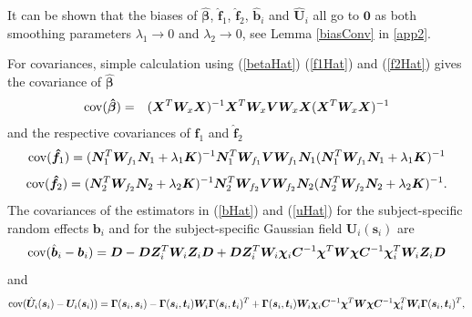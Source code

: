 \documentclass[review]{elsarticle}
\begin{document}
It can be shown that the biases of $\boldsymbol {\hat \beta}$, $\boldsymbol {\hat f}_1$, $\boldsymbol {\hat f}_2$, $\boldsymbol {\hat b}_i$ and $\boldsymbol {\hat U}_i$ all go to $\boldsymbol 0$ as both smoothing parameters $\lambda_1 \to 0$ and $\lambda_2 \to 0$, see Lemma \ref{biasConv} in  \ref{app2}.



  
For covariances, simple calculation using (\ref{betaHat}) (\ref{f1Hat}) and (\ref{f2Hat}) gives the covariance of $\boldsymbol {\hat \beta}$  
\begin{eqnarray*}
{\rm cov}(\boldsymbol {\hat \beta}) 
&=&
(\boldsymbol X^T  \boldsymbol W_x \boldsymbol X )^{-1} \boldsymbol X^T  \boldsymbol W_x 
\boldsymbol V 
\boldsymbol W_x \boldsymbol X (\boldsymbol X^T  \boldsymbol W_x \boldsymbol X )^{-1} 
\end{eqnarray*}
and the respective covariances of $\boldsymbol {\hat f}_1$  and $\boldsymbol {\hat f}_2$
$$
{\rm cov}(\boldsymbol {\hat f}_1) 
=
(\boldsymbol N_1^T 
\boldsymbol W_{f_1}  \boldsymbol N_1
  + \lambda_1 \boldsymbol K)^{-1}  \boldsymbol N_1^T \boldsymbol W_{f_1}
   \boldsymbol V 
\boldsymbol W_{f_1} \boldsymbol N_1
(\boldsymbol N_1^T 
\boldsymbol W_{f_1}  \boldsymbol N_1
  + \lambda_1 \boldsymbol K)^{-1}
$$
$$
{\rm cov}(\boldsymbol {\hat f}_2) 
=
(\boldsymbol N_2^T \boldsymbol W_{f_2}  \boldsymbol N_2 + \lambda_2 \boldsymbol K)^{-1} 
\boldsymbol N_2^T \boldsymbol W_{f_2} 
   \boldsymbol V 
\boldsymbol W_{f_2} \boldsymbol N_2
(\boldsymbol N_2^T \boldsymbol W_{f_2}  \boldsymbol N_2 + \lambda_2 \boldsymbol K)^{-1}.
$$
The covariances of the estimators in (\ref{bHat}) and (\ref{uHat}) for the subject-specific random effects $\boldsymbol b_i$ and for the subject-specific Gaussian field $\boldsymbol U_i(\boldsymbol s_i)$
 are  
 \begin{equation}
 \label{covIn}
{\rm cov}(\hat{\boldsymbol b}_i - \boldsymbol b_i) 
= \boldsymbol D 
-
\boldsymbol D \boldsymbol Z_i^T \boldsymbol W_i  \boldsymbol Z_i  \boldsymbol D 
+
\boldsymbol D \boldsymbol Z_i^T \boldsymbol W_i
\boldsymbol \chi_i  \boldsymbol C^{-1} \boldsymbol \chi^T
\boldsymbol W
\boldsymbol \chi  \boldsymbol C^{-1} \boldsymbol \chi_i^T
\boldsymbol  W_i \boldsymbol Z_i \boldsymbol D
\end{equation}
and 
$$
{\rm cov}(\hat{\boldsymbol U}_i (\boldsymbol s_i) - \boldsymbol U_i (\boldsymbol s_i) ) 
= \boldsymbol \Gamma(\boldsymbol s_i, \boldsymbol s_i) 
-
\boldsymbol \Gamma(\boldsymbol s_i, \boldsymbol t_i) 
\boldsymbol W_i  
\boldsymbol \Gamma(\boldsymbol s_i, \boldsymbol t_i)^T 
+
\boldsymbol \Gamma(\boldsymbol s_i, \boldsymbol t_i) \boldsymbol W_i
\boldsymbol \chi_i  \boldsymbol C^{-1} \boldsymbol \chi^T
\boldsymbol W
\boldsymbol \chi  \boldsymbol C^{-1} \boldsymbol \chi_i^T
\boldsymbol  W_i \boldsymbol \Gamma(\boldsymbol s_i, \boldsymbol t_i)^T,
$$
\end{document}
